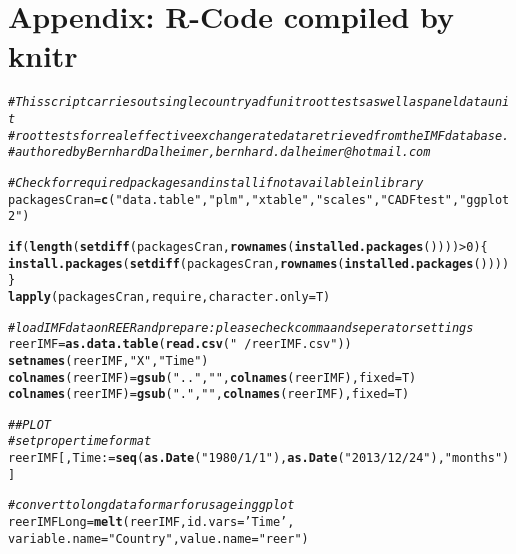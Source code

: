 \documentclass{article}\usepackage[]{graphicx}\usepackage[]{color}
\makeatletter
\newcommand{\hlnum}[1]{\textcolor[rgb]{0.686,0.059,0.569}{#1}}%
\newcommand{\hlstr}[1]{\textcolor[rgb]{0.192,0.494,0.8}{#1}}%
\newcommand{\hlcom}[1]{\textcolor[rgb]{0.678,0.584,0.686}{\textit{#1}}}%
\newcommand{\hlopt}[1]{\textcolor[rgb]{0,0,0}{#1}}%
\newcommand{\hlstd}[1]{\textcolor[rgb]{0.345,0.345,0.345}{#1}}%
\newcommand{\hlkwa}[1]{\textcolor[rgb]{0.161,0.373,0.58}{\textbf{#1}}}%
\newcommand{\hlkwb}[1]{\textcolor[rgb]{0.69,0.353,0.396}{#1}}%
\newcommand{\hlkwc}[1]{\textcolor[rgb]{0.333,0.667,0.333}{#1}}%
\newcommand{\hlkwd}[1]{\textcolor[rgb]{0.737,0.353,0.396}{\textbf{#1}}}%
\newenvironment{kframe}{%
 \def\at@end@of@kframe{}%
 \ifinner\ifhmode%
  \def\at@end@of@kframe{\end{minipage}}%
  \begin{minipage}{\columnwidth}%
 \fi\fi%
 \def\FrameCommand##1{\hskip\@totalleftmargin \hskip-\fboxsep
 \colorbox{shadecolor}{##1}\hskip-\fboxsep
     \hskip-\linewidth \hskip-\@totalleftmargin \hskip\columnwidth}%
 \MakeFramed {\advance\hsize-\width
   \@totalleftmargin\z@ \linewidth\hsize
   \@setminipage}}%
 {\par\unskip\endMakeFramed%
 \at@end@of@kframe}
\newenvironment{knitrout}{}{} %
\makeatother
\begin{document}
\appendix
\section*{Appendix: R-Code compiled by knitr }
\begin{knitrout}
\color{fgcolor}\begin{kframe}
\begin{alltt}
\hlcom{# This script carries out single country adf unit root tests as well as panel data unit }
\hlcom{# root tests for real effective exchange rate data retrieved from the IMF database.}
\hlcom{# authored by Bernhard Dalheimer, bernhard.dalheimer@hotmail.com}

\hlcom{# Check for required packages and install if not available in library}
\hlstd{packagesCran} \hlkwb{=} \hlkwd{c}\hlstd{(}\hlstr{"data.table"}\hlstd{,} \hlstr{"plm"}\hlstd{,} \hlstr{"xtable"}\hlstd{,} \hlstr{"scales"}\hlstd{,} \hlstr{"CADFtest"}\hlstd{,} \hlstr{"ggplot2"}\hlstd{)}

\hlkwa{if} \hlstd{(}\hlkwd{length}\hlstd{(}\hlkwd{setdiff}\hlstd{(packagesCran,} \hlkwd{rownames}\hlstd{(}\hlkwd{installed.packages}\hlstd{())))} \hlopt{>} \hlnum{0}\hlstd{) \{}
  \hlkwd{install.packages}\hlstd{(}\hlkwd{setdiff}\hlstd{(packagesCran,} \hlkwd{rownames}\hlstd{(}\hlkwd{installed.packages}\hlstd{())))}
\hlstd{\}}
\hlkwd{lapply}\hlstd{(packagesCran, require,} \hlkwc{character.only} \hlstd{= T)}

\hlcom{# load IMF data on REER and prepare: please check comma and seperator settings}
\hlstd{reerIMF} \hlkwb{=} \hlkwd{as.data.table}\hlstd{(}\hlkwd{read.csv}\hlstd{(}\hlstr{"~/reerIMF.csv"}\hlstd{))}
\hlkwd{setnames}\hlstd{(reerIMF,} \hlstr{"X"}\hlstd{,} \hlstr{"Time"}\hlstd{)}
\hlkwd{colnames}\hlstd{(reerIMF)} \hlkwb{=} \hlkwd{gsub}\hlstd{(}\hlstr{".."}\hlstd{,} \hlstr{" "}\hlstd{,} \hlkwd{colnames}\hlstd{(reerIMF),} \hlkwc{fixed} \hlstd{= T)}
\hlkwd{colnames}\hlstd{(reerIMF)} \hlkwb{=} \hlkwd{gsub}\hlstd{(}\hlstr{"."}\hlstd{,} \hlstr{" "}\hlstd{,} \hlkwd{colnames}\hlstd{(reerIMF),} \hlkwc{fixed} \hlstd{= T)}

\hlcom{## PLOT}
\hlcom{#set proper time format}
\hlstd{reerIMF[, Time} \hlkwb{:=} \hlkwd{seq}\hlstd{(}\hlkwd{as.Date}\hlstd{(}\hlstr{"1980/1/1"}\hlstd{),} \hlkwd{as.Date}\hlstd{(}\hlstr{"2013/12/24"}\hlstd{),} \hlstr{"months"}\hlstd{)]}

\hlcom{# convert to long data formar for usage in ggplot}
\hlstd{reerIMFLong} \hlkwb{=} \hlkwd{melt}\hlstd{(reerIMF,} \hlkwc{id.vars} \hlstd{=} \hlstr{'Time'}\hlstd{,}
                   \hlkwc{variable.name} \hlstd{=} \hlstr{"Country"}\hlstd{,} \hlkwc{value.name} \hlstd{=} \hlstr{"reer"}\hlstd{)}


\end{alltt}
\end{kframe}
\end{knitrout}
\end{document}
